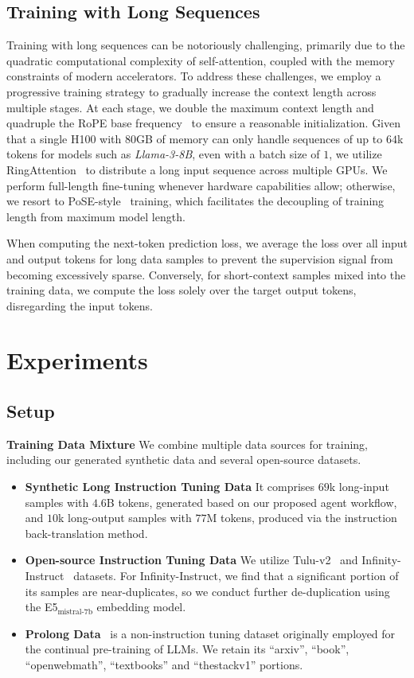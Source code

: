 \documentclass{article}
\begin{document}
\subsection{Training with Long Sequences}
Training with long sequences can be notoriously challenging,
primarily due to the quadratic computational complexity of self-attention,
coupled with the memory constraints of modern accelerators.
To address these challenges,
we employ a progressive training strategy to gradually increase the context length across multiple stages.
At each stage,
we double the maximum context length and
quadruple the RoPE base frequency~\citep{su2024roformer} to ensure a reasonable initialization.
Given that a single H100 with $80$GB of memory can only handle sequences of up to $64$k tokens
for models such as \emph{Llama-3-8B},
even with a batch size of $1$,
we utilize RingAttention~\citep{liu2023ring} to distribute a long input sequence across multiple GPUs.
We perform full-length fine-tuning whenever hardware capabilities allow;
otherwise,
we resort to PoSE-style~\citep{zhu2023pose} training,
which facilitates the decoupling of training length from maximum model length.

When computing the next-token prediction loss,
we average the loss over all input and output tokens for long data samples
to prevent the supervision signal from becoming excessively sparse.
Conversely,
for short-context samples mixed into the training data,
we compute the loss solely over the target output tokens,
disregarding the input tokens.

\section{Experiments}

\subsection{Setup}

\noindent
\textbf{Training Data Mixture }
We combine multiple data sources for training,
including our generated synthetic data and several open-source datasets.
\begin{itemize}[leftmargin=15pt]
\item \textbf{Synthetic Long Instruction Tuning Data} It comprises $69$k long-input samples with $4.6$B tokens, generated based on our proposed agent workflow, and $10$k long-output samples with $77$M tokens, produced via the instruction back-translation method.
\item \textbf{Open-source Instruction Tuning Data} We utilize Tulu-v2~\citep{ivison2023camels} and Infinity-Instruct~\citep{BAAI_Infinity-Instruct} datasets. For Infinity-Instruct, we find that a significant portion of its samples are near-duplicates, so we conduct further de-duplication using the E5$_\text{mistral-7b}$ embedding model.
\item \textbf{Prolong Data}~\citep{gao2024train} is a non-instruction tuning dataset originally employed for the continual pre-training of LLMs. We retain its ``arxiv'', ``book'', ``openwebmath'', ``textbooks'' and ``thestackv1'' portions.
\end{itemize}
\end{document}
